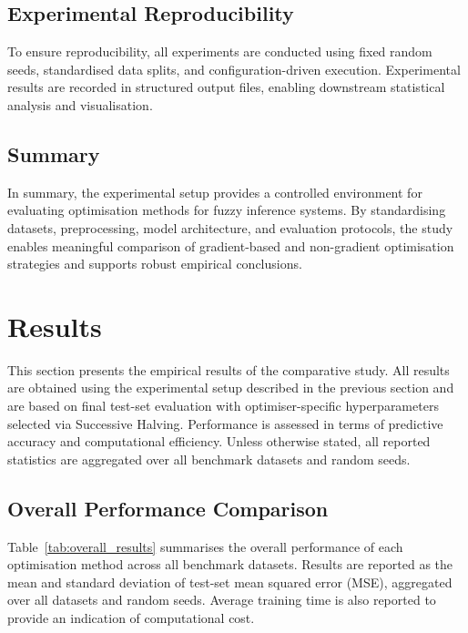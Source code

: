 \documentclass[a4paper,12pt,oneside]{article}
\begin{document}
\subsection{Experimental Reproducibility}

To ensure reproducibility, all experiments are conducted using fixed random seeds, standardised data splits, and configuration-driven execution. Experimental results are recorded in structured output files, enabling downstream statistical analysis and visualisation.

\subsection{Summary}

In summary, the experimental setup provides a controlled environment for evaluating optimisation methods for fuzzy inference systems. By standardising datasets, preprocessing, model architecture, and evaluation protocols, the study enables meaningful comparison of gradient-based and non-gradient optimisation strategies and supports robust empirical conclusions.

\newpage
\section{Results}

This section presents the empirical results of the comparative study. All results are obtained using the experimental setup described in the previous section and are based on final test-set evaluation with optimiser-specific hyperparameters selected via Successive Halving. Performance is assessed in terms of predictive accuracy and computational efficiency. Unless otherwise stated, all reported statistics are aggregated over all benchmark datasets and random seeds.

\subsection{Overall Performance Comparison}

Table~\ref{tab:overall_results} summarises the overall performance of each optimisation method across all benchmark datasets. Results are reported as the mean and standard deviation of test-set mean squared error (MSE), aggregated over all datasets and random seeds. Average training time is also reported to provide an indication of computational cost.
\end{document}
